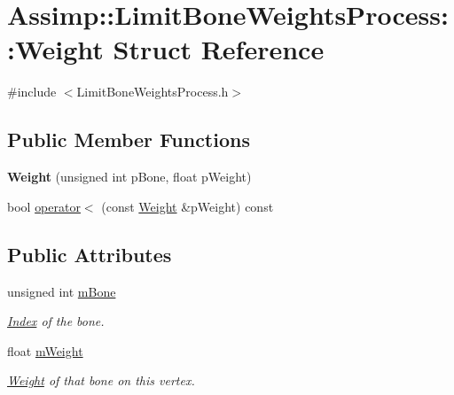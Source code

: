 \hypertarget{struct_assimp_1_1_limit_bone_weights_process_1_1_weight}{\section{Assimp\+:\+:Limit\+Bone\+Weights\+Process\+:\+:Weight Struct Reference}
\label{struct_assimp_1_1_limit_bone_weights_process_1_1_weight}
}


{\ttfamily \#include $<$Limit\+Bone\+Weights\+Process.\+h$>$}

\subsection*{Public Member Functions}
\begin{DoxyCompactItemize}
\item 
\hypertarget{struct_assimp_1_1_limit_bone_weights_process_1_1_weight_af4a9df196a9050a375fe55feac415710}{{\bfseries Weight} (unsigned int p\+Bone, float p\+Weight)}\label{struct_assimp_1_1_limit_bone_weights_process_1_1_weight_af4a9df196a9050a375fe55feac415710}

\item 
bool \hyperlink{struct_assimp_1_1_limit_bone_weights_process_1_1_weight_a16da4dddbf0cee04594b0d363603d1dd}{operator$<$} (const \hyperlink{struct_assimp_1_1_limit_bone_weights_process_1_1_weight}{Weight} \&p\+Weight) const 
\end{DoxyCompactItemize}
\subsection*{Public Attributes}
\begin{DoxyCompactItemize}
\item 
\hypertarget{struct_assimp_1_1_limit_bone_weights_process_1_1_weight_adc3e0b23f759f10a22768a894a37360a}{unsigned int \hyperlink{struct_assimp_1_1_limit_bone_weights_process_1_1_weight_adc3e0b23f759f10a22768a894a37360a}{m\+Bone}}\label{struct_assimp_1_1_limit_bone_weights_process_1_1_weight_adc3e0b23f759f10a22768a894a37360a}

\begin{DoxyCompactList}\small\item\em \hyperlink{struct_index}{Index} of the bone. \end{DoxyCompactList}\item 
\hypertarget{struct_assimp_1_1_limit_bone_weights_process_1_1_weight_af2aaeb9a3bf5b51bd81bab9e79df58e3}{float \hyperlink{struct_assimp_1_1_limit_bone_weights_process_1_1_weight_af2aaeb9a3bf5b51bd81bab9e79df58e3}{m\+Weight}}\label{struct_assimp_1_1_limit_bone_weights_process_1_1_weight_af2aaeb9a3bf5b51bd81bab9e79df58e3}

\begin{DoxyCompactList}\small\item\em \hyperlink{struct_assimp_1_1_limit_bone_weights_process_1_1_weight}{Weight} of that bone on this vertex. \end{DoxyCompactList}\end{DoxyCompactItemize}


